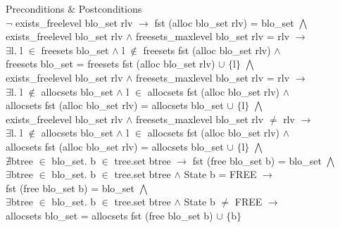\documentclass[runningheads]{llncs}
\begin{document}
\begin{definition} {Preconditions $\&$ Postconditions} \\
$\neg$ exists\_freelevel blo\_set rlv $\longrightarrow$ fst (alloc blo\_set rlv) = blo\_set $\bigwedge$ \\
exists\_freelevel blo\_set rlv $\wedge$ freesets\_maxlevel blo\_set rlv = rlv $\longrightarrow$ \\
\phantom{x} \hspace{10pt} $\exists$l. l $\in$ freesets blo\_set $\wedge$ l $\notin$ freesets fst (alloc blo\_set rlv) $\wedge$ \\
\phantom{x} \hspace{10pt} freesets blo\_set = freesets fst (alloc blo\_set rlv) $\cup$ $\lbrace$l$\rbrace$ $\bigwedge$ \\
exists\_freelevel blo\_set rlv $\wedge$ freesets\_maxlevel blo\_set rlv = rlv $\longrightarrow$ \\
\phantom{x} \hspace{10pt} $\exists$l. l $\notin$ allocsets blo\_set $\wedge$ l $\in$ allocsets fst (alloc blo\_set rlv) $\wedge$ \\
\phantom{x} \hspace{10pt} allocsets fst (alloc blo\_set rlv) = allocsets blo\_set $\cup$ $\lbrace$l$\rbrace$ $\bigwedge$ \\
exists\_freelevel blo\_set rlv $\wedge$ freesets\_maxlevel blo\_set rlv $\neq$ rlv $\longrightarrow$ \\
\phantom{x} \hspace{10pt} $\exists$l. l $\notin$ allocsets blo\_set $\wedge$ l $\in$ allocsets fst (alloc blo\_set rlv) $\wedge$ \\
\phantom{x} \hspace{10pt} allocsets fst (alloc blo\_set rlv) = allocsets blo\_set $\cup$ $\lbrace$l$\rbrace$ $\bigwedge$ \\
$\nexists$btree $\in$ blo\_set. b $\in$ tree.set btree $\longrightarrow$ fst (free blo\_set b) = blo\_set $\bigwedge$ \\
$\exists$btree $\in$ blo\_set. b $\in$ tree.set btree $\wedge$ State b = FREE $\longrightarrow$ \\
\phantom{x} \hspace{10pt} fst (free blo\_set b) = blo\_set $\bigwedge$ \\
$\exists$btree $\in$ blo\_set. b $\in$ tree.set btree $\wedge$ State b $\neq$ FREE $\longrightarrow$ \\
\phantom{x} \hspace{10pt} allocsets blo\_set = allocsets fst (free blo\_set b) $\cup$ $\lbrace$b$\rbrace$
\end{definition}
\end{document}

